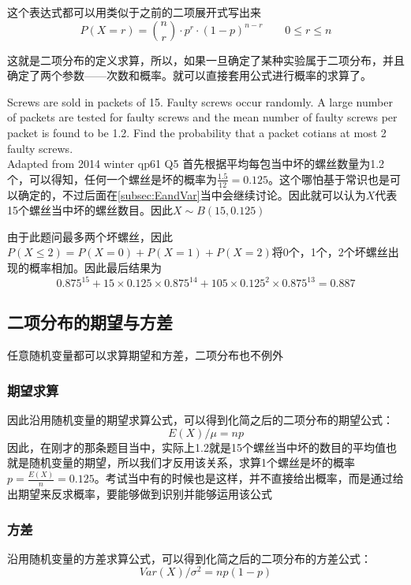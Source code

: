 这个表达式都可以用类似于之前的二项展开式写出来
\[
	P(X=r) = \binom{n}{r}\cdot p^r\cdot (1-p)^{n-r} \qquad 0\leqslant r \leqslant n
\]

这就是二项分布的定义求算，所以，如果一旦确定了某种实验属于二项分布，并且确定了两个参数——次数和概率。就可以直接套用公式进行概率的求算了。

\begin{ExampleBox}
Screws are sold in packets of 15. Faulty screws occur randomly. A large number of packets are tested for faulty screws and the mean number of faulty screws per packet is found to be 1.2. Find the probability that a packet cotians at most 2 faulty screws.\\
\makebox{}\hfill Adapted from 2014 winter qp61 Q5
\tcblower
首先根据平均每包当中坏的螺丝数量为1.2个，可以得知，任何一个螺丝是坏的概率为$\frac{1.5}{12}=0.125$。这个哪怕基于常识也是可以确定的，不过后面在\ref{subsec:EandVar}当中会继续讨论。因此就可以认为$X$代表15个螺丝当中坏的螺丝数目。因此$X\sim B(15,0.125)$

由于此题问最多两个坏螺丝，因此$P(X\leqslant2 )= P(X=0)+P(X=1)+P(X=2)$将0个，1个，2个坏螺丝出现的概率相加。因此最后结果为
\[
	0.875^15+15\times 0.125\times 0.875^{14}+105\times 0.125^2\times 0.875^{13} = 0.887
\]
\end{ExampleBox}

\subsection*{二项分布的期望与方差}
\label{subsec:EandVar}
任意随机变量都可以求算期望和方差，二项分布也不例外

\subsubsection*{期望求算}
因此沿用随机变量的期望求算公式，可以得到化简之后的二项分布的期望公式：
\[
	E(X)/\mu = np
\]
因此，在刚才的那条题目当中，实际上1.2就是15个螺丝当中坏的数目的平均值也就是随机变量的期望，所以我们才反用该关系，求算1个螺丝是坏的概率$p = \frac{E(X)}{n}=0.125$。考试当中有的时候也是这样，并不直接给出概率，而是通过给出期望来反求概率，要能够做到识别并能够运用该公式

\subsubsection*{方差}
沿用随机变量的方差求算公式，可以得到化简之后的二项分布的方差公式：
\[
	Var(X)/\sigma^2 =np(1-p) 
\]

